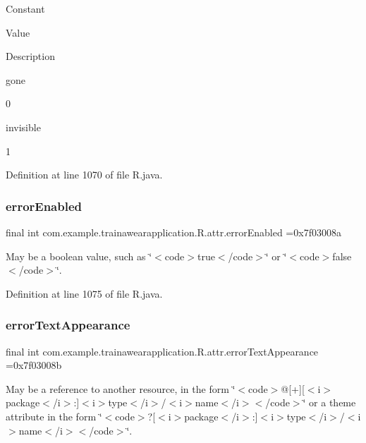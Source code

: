 Constant

Value

Description 

gone

0

invisible

1

Definition at line 1070 of file R.\+java.

\mbox{\label{classcom_1_1example_1_1trainawearapplication_1_1_r_1_1attr_a2885421d977b6b2cb501458b7d659d2d}} 
\subsubsection{\texorpdfstring{errorEnabled}{errorEnabled}}
{\footnotesize\ttfamily final int com.\+example.\+trainawearapplication.\+R.\+attr.\+error\+Enabled =0x7f03008a\hspace{0.3cm}{\ttfamily [static]}}

May be a boolean value, such as \char`\"{}$<$code$>$true$<$/code$>$\char`\"{} or \char`\"{}$<$code$>$false$<$/code$>$\char`\"{}. 

Definition at line 1075 of file R.\+java.

\mbox{\label{classcom_1_1example_1_1trainawearapplication_1_1_r_1_1attr_aa5ac9c5c13c5b737a7d1cde79ef03389}} 
\subsubsection{\texorpdfstring{errorTextAppearance}{errorTextAppearance}}
{\footnotesize\ttfamily final int com.\+example.\+trainawearapplication.\+R.\+attr.\+error\+Text\+Appearance =0x7f03008b\hspace{0.3cm}{\ttfamily [static]}}

May be a reference to another resource, in the form \char`\"{}$<$code$>$@\mbox{[}+\mbox{]}\mbox{[}$<$i$>$package$<$/i$>$\+:\mbox{]}$<$i$>$type$<$/i$>$/$<$i$>$name$<$/i$>$$<$/code$>$\char`\"{} or a theme attribute in the form \char`\"{}$<$code$>$?\mbox{[}$<$i$>$package$<$/i$>$\+:\mbox{]}$<$i$>$type$<$/i$>$/$<$i$>$name$<$/i$>$$<$/code$>$\char`\"{}. 

